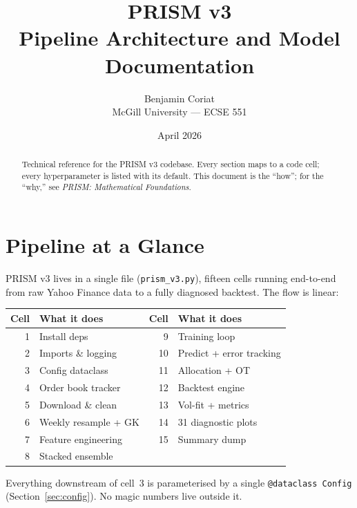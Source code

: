 \documentclass[11pt]{article}
\title{\textbf{PRISM v3}\\[4pt]
\large Pipeline Architecture and Model Documentation}
\author{Benjamin Coriat\\McGill University --- ECSE 551}
\date{April 2026}
\newcommand{\code}[1]{\texttt{#1}}
\begin{document}
\maketitle

\begin{abstract}
Technical reference for the PRISM v3 codebase.
Every section maps to a code cell; every hyperparameter is listed with its default.
This document is the ``how''; for the ``why,'' see \textit{PRISM: Mathematical Foundations}.
\end{abstract}

\newpage
\tableofcontents
\newpage

\section{Pipeline at a Glance}

PRISM v3 lives in a single file (\code{prism\_v3.py}), fifteen cells
running end-to-end from raw Yahoo Finance data to a fully diagnosed backtest.
The flow is linear:

\begin{center}
\renewcommand{\arraystretch}{1.15}
\begin{tabular}{@{}r@{\;\;}l@{\qquad}r@{\;\;}l@{}}
\toprule
\textbf{Cell} & \textbf{What it does} & \textbf{Cell} & \textbf{What it does}\\
\midrule
1  & Install deps          & 9  & Training loop\\
2  & Imports \& logging    & 10 & Predict + error tracking\\
3  & Config dataclass      & 11 & Allocation + OT\\
4  & Order book tracker    & 12 & Backtest engine\\
5  & Download \& clean     & 13 & Vol-fit + metrics\\
6  & Weekly resample + GK  & 14 & 31 diagnostic plots\\
7  & Feature engineering   & 15 & Summary dump\\
8  & Stacked ensemble      &    & \\
\bottomrule
\end{tabular}
\end{center}

Everything downstream of cell~3 is parameterised by a single
\code{@dataclass Config} (Section~\ref{sec:config}).
No magic numbers live outside it.
\end{document}
